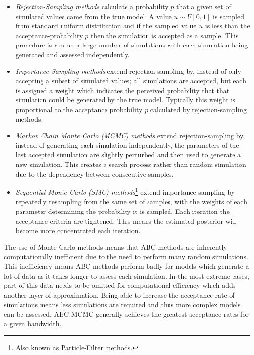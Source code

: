 \documentclass[11pt,a4paper]{article}
\theoremstyle{break}
\begin{document}
  \begin{itemize}
    \item \textit{Rejection-Sampling methods} calculate a probability $p$ that a given set of simulated values came from the true model. A value $u\sim U[0,1]$ is sampled from standard uniform distribution and if the sampled value $u$ is less than the acceptance-probability $p$ then the simulation is accepted as a sample. This procedure is run on a large number of simulations with each simulation being generated and assessed independently.

    \item \textit{Importance-Sampling methods} extend rejection-sampling by, instead of only accepting a subset of simulated values; all simulations are accepted, but each is assigned a weight which indicates the perceived probability that that simulation could be generated by the true model. Typically this weight is proportional to the acceptance probability $p$ calculated by rejection-sampling methods.

    \item \textit{Markov Chain Monte Carlo (MCMC) methods} extend rejection-sampling by, instead of generating each simulation independently, the parameters of the last accepted simulation are slightly perturbed and then used to generate a new simulation. This creates a search process rather than random simulation due to the dependency between consecutive samples.

    \item \textit{Sequential Monte Carlo (SMC) methods}\footnote{Also known as Particle-Filter methods.} extend importance-sampling by repeatedly resampling from the same set of samples, with the weights of each parameter determining the probability it is sampled. Each iteration the acceptance criteria are tightened. This means the estimated posterior will become more concentrated each iteration.
  \end{itemize}

  \par The use of Monte Carlo methods means that ABC methods are inherently computationally inefficient due to the need to perform many random simulations. This inefficiency means ABC methods perform badly for models which generate a lot of data as it takes longer to assess each simulation. In the most extreme cases, part of this data needs to be omitted for computational efficiency which adds another layer of approximation. Being able to increase the acceptance rate of simulations means less simulations are required and thus more complex models can be assessed. ABC-MCMC generally achieves the greatest acceptance rates for a given bandwidth.
\end{document}
